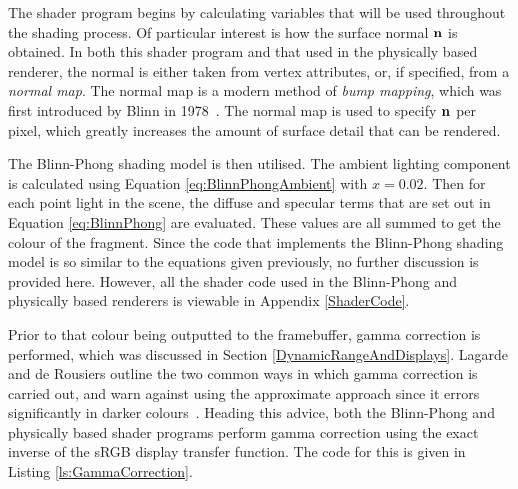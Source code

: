 The shader program begins by calculating variables that will be used throughout the shading process. Of particular interest is how the surface normal \begin{math}\mathbf{n}\end{math} is obtained. In both this shader program and that used in the physically based renderer, the normal is either taken from vertex attributes, or, if specified, from a \textit{normal map}. The normal map is a modern method of \textit{bump mapping}, which was first introduced by Blinn in 1978~\cite{BlinnBumpMapping}. The normal map is used to specify \begin{math}\mathbf{n}\end{math} per pixel, which greatly increases the amount of surface detail that can be rendered.

The Blinn-Phong shading model is then utilised. The ambient lighting component is calculated using Equation \ref{eq:BlinnPhongAmbient} with \begin{math}x = 0.02\end{math}. Then for each point light in the scene, the diffuse and specular terms that are set out in Equation \ref{eq:BlinnPhong} are evaluated. These values are all summed to get the colour of the fragment. Since the code that implements the Blinn-Phong shading model is so similar to the equations given previously, no further discussion is provided here. However, all the shader code used in the Blinn-Phong and physically based renderers is viewable in Appendix \ref{ShaderCode}.

Prior to that colour being outputted to the framebuffer, gamma correction is performed, which was discussed in Section \ref{DynamicRangeAndDisplays}. Lagarde and de Rousiers outline the two common ways in which gamma correction is carried out, and warn against using the approximate approach since it errors significantly in darker colours~\cite{MovingFrostbitetoPBR}. Heading this advice, both the Blinn-Phong and physically based shader programs perform gamma correction using the exact inverse of the sRGB display transfer function. The code for this is given in Listing \ref{ls:GammaCorrection}.


